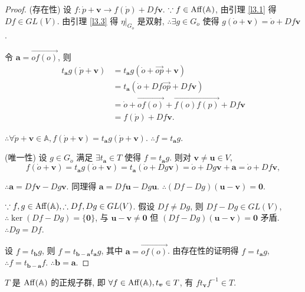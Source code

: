\documentclass[color=black,device=normal,lang=cn,mode=geye]{elegantnote}
\begin{document}
\begin{proof}
    (存在性) 设 $f:\dot{p}+\boldsymbol{v}\to f(\dot{p})+Df\boldsymbol{v}$. $\because f\in\operatorname{Aff} (\mathbb{A})$, 由引理 \ref{l3.1} 得 $Df\in GL (V)$. 由引理 \ref{l3.3} 得 $\eta|_{G_{\dot{o}}}$ 是双射, $\therefore\exists g\in G_{\dot{o}}$ 使得 $g(\dot{o}+\boldsymbol{v})=\dot{o}+Df\boldsymbol{v}$.

    令 $\boldsymbol{a}=\overrightarrow{of(o)}$, 则
    \begin{align*}
        t_{\boldsymbol{a}}g(\dot{p}+\boldsymbol{v}) & =t_{\boldsymbol{a}}g(\dot{o}+\overrightarrow{op}+\boldsymbol{v}) \\
        & =t_{\boldsymbol{a}}(\dot{o}+Df\overrightarrow{op}+Df\boldsymbol{v}) \\
        & =\dot{o}+\overrightarrow{of(o)}+\overrightarrow{f(o)f(p)}+Df\boldsymbol{v} \\
        & =f(\dot{p})+Df\boldsymbol{v}.
    \end{align*}

    $\therefore\forall\dot{p}+\boldsymbol{v}\in\mathbb{A},f(\dot{p}+\boldsymbol{v})=t_{\boldsymbol{a}}g(\dot{p}+\boldsymbol{v})$. $\therefore f=t_{\boldsymbol{a}}g$.

    (唯一性) 设 $g\in G_{\dot{o}}$ 满足 $\exists t_{\boldsymbol{a}}\in T$ 使得 $f=t_{\boldsymbol{a}}g$. 则对 $\boldsymbol{v}\neq\boldsymbol{u}\in V$,
    \[f(\dot{o}+\boldsymbol{v})=t_{\boldsymbol{a}}g(\dot{o}+\boldsymbol{v})=t_{\boldsymbol{a}}(\dot{o}+Dg\boldsymbol{v})=\dot{o}+Dg\boldsymbol{v}+\boldsymbol{a}=\dot{o}+Df\boldsymbol{v},\]

    $\therefore\boldsymbol{a}=Df\boldsymbol{v}-Dg\boldsymbol{v}$. 同理得 $\boldsymbol{a}=Df\boldsymbol{u}-Dg\boldsymbol{u}$. $\therefore(Df-Dg)(\boldsymbol{u}-\boldsymbol{v})=\boldsymbol{0}$.

    $\because f,g\in\operatorname{Aff} (\mathbb{A}),\therefore Df,Dg\in GL (V)$. 假设 $Df\neq Dg$, 则 $Df-Dg\in GL (V)$, $\therefore\ker(Df-Dg)=\{\boldsymbol{0}\}$, 与 $\boldsymbol{u}-\boldsymbol{v}\neq\boldsymbol{0}$ 但 $(Df-Dg)(\boldsymbol{u}-\boldsymbol{v})=\boldsymbol{0}$ 矛盾. $\therefore Dg=Df$.

    设 $f=t_{\boldsymbol{b}}g$, 则 $f=t_{\boldsymbol{b}-\boldsymbol{a}}t_{\boldsymbol{a}}g$, 其中 $\boldsymbol{a}=\overrightarrow{of(o)}$. 由存在性的证明得 $f=t_{\boldsymbol{a}}g$, $\therefore f=t_{\boldsymbol{b}-\boldsymbol{a}}f$. $\therefore\boldsymbol{b}=\boldsymbol{a}$.
\end{proof}
\begin{theorem}\label{t3.2}
    $T$ 是 $\operatorname{Aff} (\mathbb{A})$ 的正规子群, 即 $\forall f\in\operatorname{Aff} (\mathbb{A}),t_{\boldsymbol{v}}\in T$, 有 $ft_{\boldsymbol{v}}f^{-1}\in T$.
\end{theorem}
\end{document}
